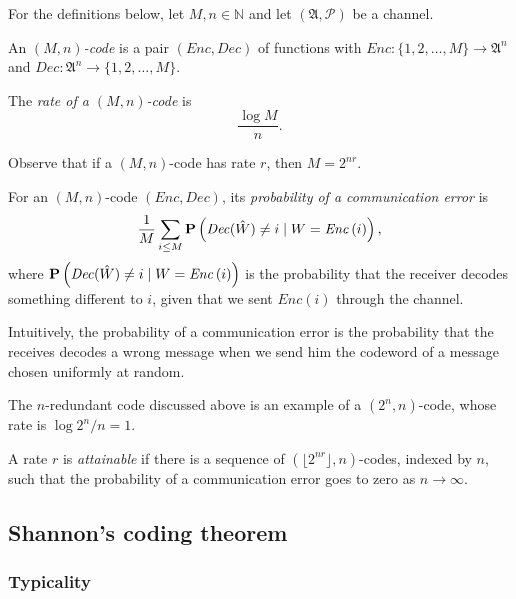 For the definitions below, let $M, n \in \mathbb{N}$ and let $(\mathfrak{A}, \mathcal{P})$ be a channel.

\begin{definition}
An \emph{$(M, n)$-code} is a pair $(\mathit{Enc}, \mathit{Dec})$ of functions with $\mathit{Enc}: \{1, 2, \ldots, M\} \to \mathfrak{A}^n$ and $\mathit{Dec}: \mathfrak{A}^n \to \{1, 2, \ldots, M\}$.
\end{definition}

\begin{definition}
The \emph{rate of a $(M, n)$-code} is 
%
$$\frac{\log M}{n}.$$
%
\end{definition}

Observe that if a $(M, n)$-code has rate $r$, then $M = 2^{nr}$.

\begin{definition}
For an $(M, n)$-code $(\mathit{Enc}, \mathit{Dec})$,
its \emph{probability of a communication error} is
%
$$\frac{1}{M}\sum_{i \leq M} \mathbf{P}\left(\mathit{Dec}(\hat{W}) \neq i \mid W = \mathit{Enc}\left(i\right)\right),$$
%
where $\mathbf{P}\left(\mathit{Dec}(\hat{W}) \neq i \mid W = \mathit{Enc}\left(i\right)\right)$ is the probability that the receiver decodes something different to $i$, given that we sent $\mathit{Enc}\left(i\right)$ through the channel.
\end{definition}

Intuitively, the probability of a communication error is the probability that the receives decodes a wrong message when we send him the codeword of a message chosen uniformly at random.

\begin{example}
The $n$-redundant code discussed above is an example of a $(2^n, n)$-code, whose rate is $\log 2^n / n = 1$.
\end{example}

\begin{definition}
A rate $r$ is \emph{attainable} if there is a sequence of $\left(\lfloor2^{nr}\rfloor, n\right)$-codes, indexed by $n$, such that the probability of a communication error goes to zero as $n \to \infty$.
\end{definition}

\subsection{Shannon's coding theorem}

\subsubsection*{Typicality}


